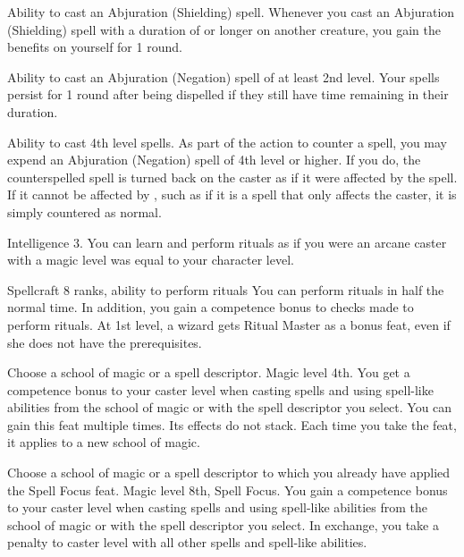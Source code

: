 \featpre Ability to cast an Abjuration (Shielding) spell.
\featben Whenever you cast an Abjuration (Shielding) spell with a duration of \durshort or longer on another creature, you gain the benefits on yourself for 1 round.

\featpre Ability to cast an Abjuration (Negation) spell of at least 2nd level.
\featben Your spells persist for 1 round after being dispelled if they still have time remaining in their duration.

 Ability to cast 4th level spells.
 As part of the action to counter a spell, you may expend an Abjuration (Negation) spell of 4th level or higher. If you do, the counterspelled spell is turned back on the caster as if it were affected by the  spell. If it cannot be affected by , such as if it is a spell that only affects the caster, it is simply countered as normal.

\featpre Intelligence 3.
\featben You can learn and perform rituals as if you were an arcane caster with a magic level was equal to your character level.

 Spellcraft 8 ranks, ability to perform rituals
 You can perform rituals in half the normal time. In addition, you gain a  competence bonus to checks made to perform rituals.
 At 1st level, a wizard gets Ritual Master as a bonus feat, even if she does not have the prerequisites.

Choose a school of magic or a spell descriptor.
 Magic level 4th.
 You get a  competence bonus to your caster level when casting spells and using spell-like abilities from the school of magic or with the spell descriptor you select.
 You can gain this feat multiple times. Its effects do not stack. Each time you take the feat, it applies to a new school of magic.

Choose a school of magic or a spell descriptor to which you already have applied the Spell Focus feat.
\featpre Magic level 8th, Spell Focus.
\featben You gain a  competence bonus to your caster level when casting spells and using spell-like abilities from the school of magic or with the spell descriptor you select. In exchange, you take a  penalty to caster level with all other spells and spell-like abilities.

